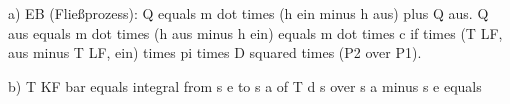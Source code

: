 a) EB (Fließprozess):
Q equals m dot times (h ein minus h aus) plus Q aus.
Q aus equals m dot times (h aus minus h ein) equals m dot times c if times (T LF, aus minus T LF, ein) times pi times D squared times (P2 over P1).

b) T KF bar equals integral from s e to s a of T d s over s a minus s e equals